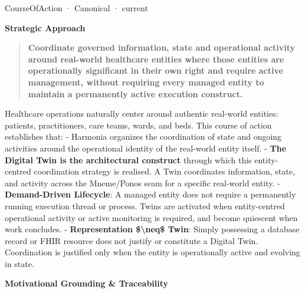 \label{element:f601fe1f39a3447f8e9fb2cc4ffe9dee}
{\small CourseOfAction · Canonical · current}\par

\par\medskip\textbf{Strategic Approach}\par


\begin{quote}


\textbf{Coordinate governed information, state and operational activity around real-world healthcare entities where those entities are operationally significant in their own right and require active management, without requiring every managed entity to maintain a permanently active execution construct.}



\end{quote}


Healthcare operations naturally center around authentic real-world entities: patients, practitioners, care teams, wards, and beds. This course of action establishes that:
- Harmonia organizes the coordination of state and ongoing activities around the operational identity of the real-world entity itself.
- \textbf{The Digital Twin is the architectural construct} through which this entity-centred coordination strategy is realised. A Twin coordinates information, state, and activity across the Mneme/Ponos seam for a specific real-world entity.
- \textbf{Demand-Driven Lifecycle}: A managed entity does not require a permanently running execution thread or process. Twins are activated when entity-centred operational activity or active monitoring is required, and become quiescent when work concludes.
- \textbf{Representation \$\textbackslash{}neq\$ Twin}: Simply possessing a database record or FHIR resource does not justify or constitute a Digital Twin. Coordination is justified only when the entity is operationally active and evolving in state.



\par\medskip\textbf{Motivational Grounding \& Traceability}\par


